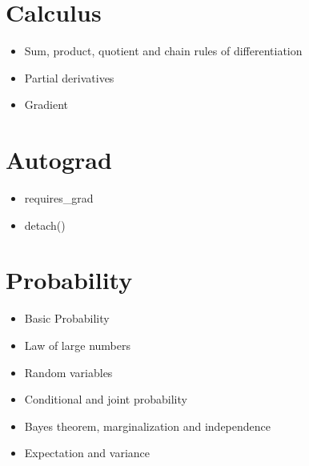 \documentclass[12pt,notitlepage]{article}
\begin{document}
\section{Calculus}
\begin{itemize}
    \item Sum, product, quotient and chain rules of differentiation
    \item Partial derivatives
    \item Gradient
\end{itemize}

\section{Autograd}
\begin{itemize}
    \item requires\_grad
    \item detach()
\end{itemize}

\section{Probability}
\begin{itemize}
    \item Basic Probability
    \item Law of large numbers
    \item Random variables
    \item Conditional and joint probability
    \item Bayes theorem, marginalization and independence
    \item Expectation and variance
\end{itemize}


\vfill

\nocite{zhang2020dive}
\end{document}
